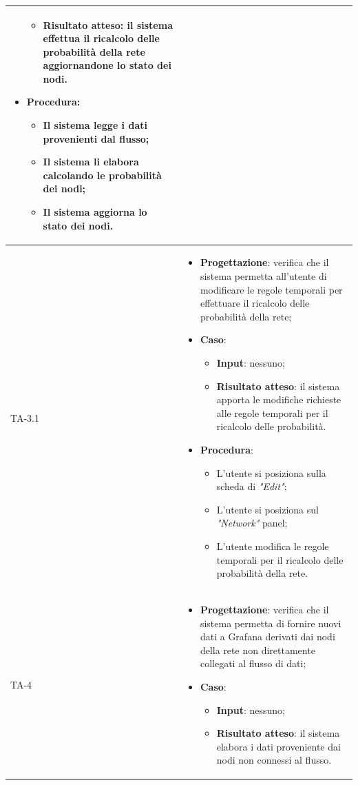 \begin{longtable}{|C{2.5cm}|C{13cm}|}
\begin{itemize}
\begin{itemize}
		\item \textbf{Risultato atteso}: il sistema effettua il ricalcolo delle probabilità della rete aggiornandone lo stato dei nodi.
	\end{itemize}
	\item \textbf{Procedura}:
	\begin{itemize}
		\item Il sistema legge i dati provenienti dal flusso;
		\item Il sistema li elabora calcolando le probabilità dei nodi;
		\item Il sistema aggiorna lo stato dei nodi.
	\end{itemize} 
\end{itemize}\\
\hline
{TA-3.1} &
\begin{itemize}
	\item \textbf{Progettazione}: verifica che il sistema permetta all'utente di modificare le regole temporali per effettuare il ricalcolo delle probabilità della rete;
	\item \textbf{Caso}: 
	\begin{itemize}
		\item \textbf{Input}: nessuno;
		\item \textbf{Risultato atteso}: il sistema apporta le modifiche richieste alle regole temporali per il ricalcolo delle probabilità.
	\end{itemize}
	\item \textbf{Procedura}:
	\begin{itemize}
		\item L'utente si posiziona sulla scheda di \emph{"Edit"};
		\item L'utente si posiziona sul \emph{"Network"} panel;
		\item L'utente modifica le regole temporali per il ricalcolo delle probabilità della rete.
	\end{itemize} 
\end{itemize} \\
\hline
{TA-4} &
\begin{itemize}
	\item \textbf{Progettazione}: verifica che il sistema permetta di fornire nuovi dati a Grafana derivati dai nodi della rete non direttamente collegati al flusso di
	dati;
	\item \textbf{Caso}: 
	\begin{itemize}
		\item \textbf{Input}: nessuno;
		\item \textbf{Risultato atteso}: il sistema elabora i dati proveniente dai nodi non connessi al flusso.

\end{itemize}
\end{itemize}
\end{longtable}

